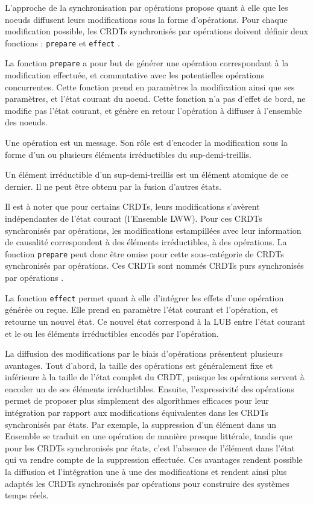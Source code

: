 L'approche de la synchronisation par opérations propose quant à elle que les noeuds diffusent leurs modifications sous la forme d'opérations.
Pour chaque modification possible, les \acp{CRDT} synchronisés par opérations doivent définir deux fonctions : \texttt{prepare} et \texttt{effect} \cite{baquero2017pure}.

La fonction \texttt{prepare} a pour but de générer une opération correspondant à la modification effectuée, et commutative avec les potentielles opérations concurrentes.
Cette fonction prend en paramètres la modification ainsi que ses paramètres, et l'état courant du noeud.
Cette fonction n'a pas d'effet de bord, \ie ne modifie pas l'état courant, et génère en retour l'opération à diffuser à l'ensemble des noeuds.

Une opération est un message.
Son rôle est d'encoder la modification sous la forme d'un ou plusieurs éléments irréductibles du sup-demi-treillis.

\begin{definition}
  \label{def:irreducible-element}
  Un élément irréductible d'un sup-demi-treillis est un élément atomique de ce dernier.
  Il ne peut être obtenu par la fusion d'autres états.
\end{definition}

Il est à noter que pour certains \acp{CRDT}, leurs modifications s'avèrent indépendantes de l'état courant (\eg l'Ensemble LWW).
Pour ces \acp{CRDT} synchronisés par opérations, les modifications estampillées avec leur information de causalité correspondent à des éléments irréductibles, \ie à des opérations.
La fonction \texttt{prepare} peut donc être omise pour cette sous-catégorie de \acp{CRDT} synchronisés par opérations.
Ces \acp{CRDT} sont nommés \acp{CRDT} purs synchronisés par opérations \cite{baquero2017pure}.

La fonction \texttt{effect} permet quant à elle d'intégrer les effets d'une opération générée ou reçue.
Elle prend en paramètre l'état courant et l'opération, et retourne un nouvel état.
Ce nouvel état correspond à la \ac{LUB} entre l'état courant et le ou les éléments irréductibles encodés par l'opération.

La diffusion des modifications par le biais d'opérations présentent plusieurs avantages.
Tout d'abord, la taille des opérations est généralement fixe et inférieure à la taille de l'état complet du \ac{CRDT}, puisque les opérations servent à encoder un de ses éléments irréductibles.
Ensuite, l'expressivité des opérations permet de proposer plus simplement des algorithmes efficaces pour leur intégration par rapport aux modifications équivalentes dans les \acp{CRDT} synchronisés par états.
Par exemple, la suppression d'un élément dans un Ensemble se traduit en une opération de manière presque littérale, tandis que pour les \acp{CRDT} synchronisés par états, c'est l'absence de l'élément dans l'état qui va rendre compte de la suppression effectuée.
Ces avantages rendent possible la diffusion et l'intégration une à une des modifications et rendent ainsi plus adaptés les \acp{CRDT} synchronisés par opérations pour construire des systèmes temps réels.

